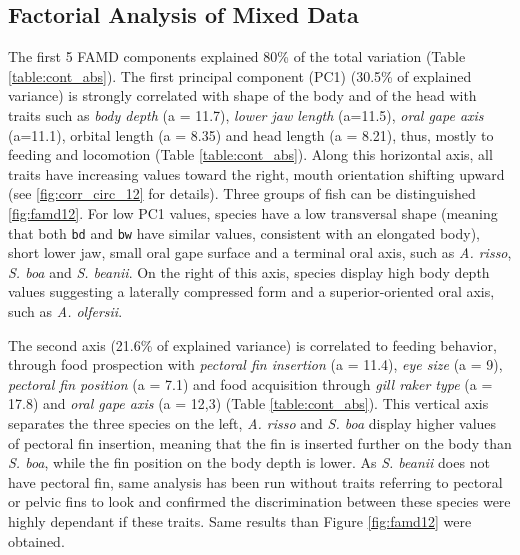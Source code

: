 
\subsection{Factorial Analysis of Mixed Data}
The first 5 FAMD components explained 80\% of the total variation (Table \ref{table:cont_abs}). The first principal component (PC1) (30.5\% of explained variance) is strongly correlated with shape of the body and of the head with traits such as \emph{body depth} (a = 11.7), \emph{lower jaw length} (a=11.5), \emph{oral gape axis} (a=11.1), orbital length (a = 8.35) and head length (a = 8.21), thus, mostly to feeding and locomotion (Table \ref{table:cont_abs}). Along this horizontal axis, all traits have increasing values toward the right, mouth orientation shifting upward (see \ref{fig:corr_circ_12} for details). Three groups of fish can be distinguished \ref{fig:famd12}. For low PC1 values, species have a low transversal shape (meaning that both \texttt{bd} and \texttt{bw} have similar values, consistent with an elongated body), short lower jaw, small oral gape surface and a terminal oral axis, such as \textit{A. risso}, \textit{S. boa} and \textit{S. beanii}. On the right of this axis, species display high body depth values suggesting a laterally compressed form and a superior-oriented oral axis, such as \textit{A. olfersii}. 

The second axis (21.6\% of explained variance) is correlated to feeding behavior, through food prospection with \emph{pectoral fin insertion} (a = 11.4), \emph{eye size} (a = 9), \emph{pectoral fin position} (a = 7.1) and food acquisition through \emph{gill raker type} (a = 17.8) and \emph{oral gape axis} (a = 12,3) (Table \ref{table:cont_abs}). This vertical axis separates the three species on the left, \textit{A. risso} and \textit{S. boa} display higher values of pectoral fin insertion, meaning that the fin is inserted further on the body than \textit{S. boa}, while the fin position on the body depth is lower. As \textit{S. beanii} does not have pectoral fin, same analysis has been run without traits referring to pectoral or pelvic fins to look and confirmed the discrimination between these species were highly dependant if these traits. Same results than Figure \ref{fig:famd12} were obtained.

